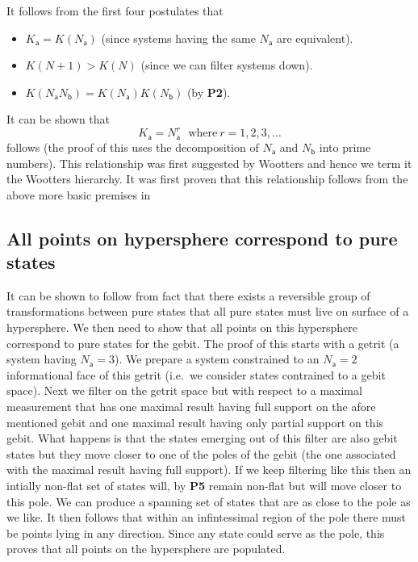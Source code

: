 \documentclass[10pt]{article}
\begin{document}
It follows from the first four postulates that
\begin{itemize}
\item $K_\mathsf{a}=K(N_\mathsf{a})$ (since systems having the same $N_\mathsf{a}$ are equivalent).
\item $K(N+1)>K(N)$ (since we can filter systems down).
\item $K(N_\mathsf{a}N_\mathsf{b})= K(N_\mathsf{a}) K( N_\mathsf{b})$ (by {\bf P2}).
\end{itemize}
It can be shown that
\vskip 5mm
\[ K_\mathsf{a}=N_\mathsf{a}^r   ~~~\text{where}~r=1,2,3,\dots  \]
follows (the proof of this uses the decomposition of $N_\mathsf{a}$ and $N_\mathsf{b}$ into prime numbers).  This relationship was first suggested by Wootters \cite{wootters1986quantum, wootters1990local} and hence we term it the Wootters hierarchy.  It was first proven that this relationship follows from the above more basic premises in \cite{hardy2001quantum}


\subsection{All points on hypersphere correspond to pure states}




It can be shown to follow from fact that there exists a reversible group of transformations between pure states that all pure states must live on surface of a hypersphere.  We then need to show that all points on this hypersphere correspond to pure states for the gebit.   The proof of this starts with a getrit (a system having $N_\mathsf{a}=3$).  We prepare a system constrained to an $N_\mathsf{a}=2$ informational face of this getrit (i.e.\ we consider states contrained to a gebit space).  Next we filter on the getrit space but with respect to a maximal measurement that has one maximal result having full support on the afore mentioned gebit and one maximal result having only partial support on this gebit.  What happens is that the states emerging out of this filter are also gebit states but they move closer to one of the poles of the gebit (the one associated with the maximal result having full support).  If we keep filtering like this then an intially non-flat set of states will, by {\bf P5} remain non-flat but will move closer to this pole.  We can produce a spanning set of states that are as close to the pole as we like.  It then follows that within an infintessimal region of the pole there must be points lying in any direction.  Since any state could serve as the pole, this proves that all points on the hypersphere are populated.
\end{document}

